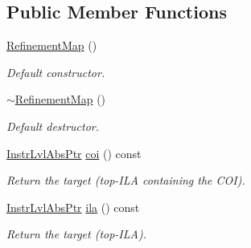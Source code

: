 \subsection*{Public Member Functions}
\begin{DoxyCompactItemize}
\item 
\mbox{\label{classilang_1_1_refinement_map_a29de1c380688f7e57bf8c15cdf5f9c0b}} 
\mbox{\hyperlink{classilang_1_1_refinement_map_a29de1c380688f7e57bf8c15cdf5f9c0b}{Refinement\+Map}} ()
\begin{DoxyCompactList}\small\item\em Default constructor. \end{DoxyCompactList}\item 
\mbox{\label{classilang_1_1_refinement_map_a1943d4417bc6093bdeeb87416c0c4432}} 
\mbox{\hyperlink{classilang_1_1_refinement_map_a1943d4417bc6093bdeeb87416c0c4432}{$\sim$\+Refinement\+Map}} ()
\begin{DoxyCompactList}\small\item\em Default destructor. \end{DoxyCompactList}\item 
\mbox{\label{classilang_1_1_refinement_map_a6233bdd332a17f1d5b1d7b289696238b}} 
\mbox{\hyperlink{namespaceilang_ad1b30fdf347e493b3937143da05d1a72}{Instr\+Lvl\+Abs\+Ptr}} \mbox{\hyperlink{classilang_1_1_refinement_map_a6233bdd332a17f1d5b1d7b289696238b}{coi}} () const
\begin{DoxyCompactList}\small\item\em Return the target (top-\/\+I\+LA containing the C\+OI). \end{DoxyCompactList}\item 
\mbox{\label{classilang_1_1_refinement_map_a83a14a5da881e0914bf7245ac1b088d9}} 
\mbox{\hyperlink{namespaceilang_ad1b30fdf347e493b3937143da05d1a72}{Instr\+Lvl\+Abs\+Ptr}} \mbox{\hyperlink{classilang_1_1_refinement_map_a83a14a5da881e0914bf7245ac1b088d9}{ila}} () const
\begin{DoxyCompactList}\small\item\em Return the target (top-\/\+I\+LA). \end{DoxyCompactList}\item 
\mbox{\label{classilang_1_1_refinement_map_aeb5a18fcf44126369725c7ba31e1d201}} 

\end{DoxyCompactItemize}
